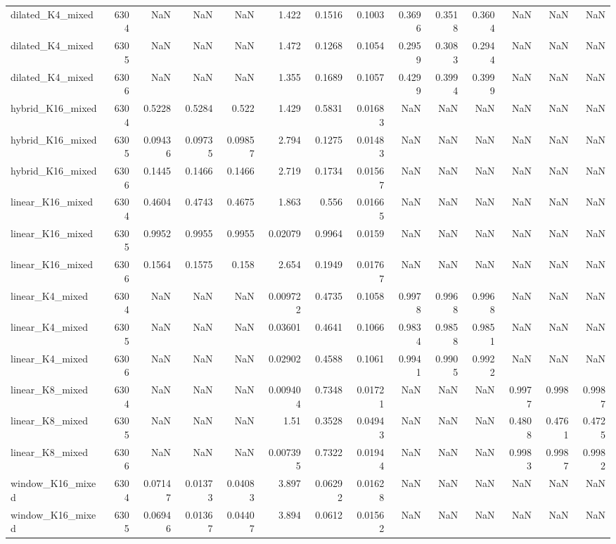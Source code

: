 \begin{table}
\begin{tabular}{lrrrrrrrrrrrrr}
dilated\_K4\_mixed & 6304 & NaN & NaN & NaN & 1.422 & 0.1516 & 0.1003 & 0.3696 & 0.3518 & 0.3604 & NaN & NaN & NaN \\
dilated\_K4\_mixed & 6305 & NaN & NaN & NaN & 1.472 & 0.1268 & 0.1054 & 0.2959 & 0.3083 & 0.2944 & NaN & NaN & NaN \\
dilated\_K4\_mixed & 6306 & NaN & NaN & NaN & 1.355 & 0.1689 & 0.1057 & 0.4299 & 0.3994 & 0.3999 & NaN & NaN & NaN \\
hybrid\_K16\_mixed & 6304 & 0.5228 & 0.5284 & 0.522 & 1.429 & 0.5831 & 0.01683 & NaN & NaN & NaN & NaN & NaN & NaN \\
hybrid\_K16\_mixed & 6305 & 0.09436 & 0.09735 & 0.09857 & 2.794 & 0.1275 & 0.01483 & NaN & NaN & NaN & NaN & NaN & NaN \\
hybrid\_K16\_mixed & 6306 & 0.1445 & 0.1466 & 0.1466 & 2.719 & 0.1734 & 0.01567 & NaN & NaN & NaN & NaN & NaN & NaN \\
linear\_K16\_mixed & 6304 & 0.4604 & 0.4743 & 0.4675 & 1.863 & 0.556 & 0.01665 & NaN & NaN & NaN & NaN & NaN & NaN \\
linear\_K16\_mixed & 6305 & 0.9952 & 0.9955 & 0.9955 & 0.02079 & 0.9964 & 0.0159 & NaN & NaN & NaN & NaN & NaN & NaN \\
linear\_K16\_mixed & 6306 & 0.1564 & 0.1575 & 0.158 & 2.654 & 0.1949 & 0.01767 & NaN & NaN & NaN & NaN & NaN & NaN \\
linear\_K4\_mixed & 6304 & NaN & NaN & NaN & 0.009722 & 0.4735 & 0.1058 & 0.9978 & 0.9968 & 0.9968 & NaN & NaN & NaN \\
linear\_K4\_mixed & 6305 & NaN & NaN & NaN & 0.03601 & 0.4641 & 0.1066 & 0.9834 & 0.9858 & 0.9851 & NaN & NaN & NaN \\
linear\_K4\_mixed & 6306 & NaN & NaN & NaN & 0.02902 & 0.4588 & 0.1061 & 0.9941 & 0.9905 & 0.9922 & NaN & NaN & NaN \\
linear\_K8\_mixed & 6304 & NaN & NaN & NaN & 0.009404 & 0.7348 & 0.01721 & NaN & NaN & NaN & 0.9977 & 0.998 & 0.9987 \\
linear\_K8\_mixed & 6305 & NaN & NaN & NaN & 1.51 & 0.3528 & 0.04943 & NaN & NaN & NaN & 0.4808 & 0.4761 & 0.4725 \\
linear\_K8\_mixed & 6306 & NaN & NaN & NaN & 0.007395 & 0.7322 & 0.01944 & NaN & NaN & NaN & 0.9983 & 0.9987 & 0.9982 \\
window\_K16\_mixed & 6304 & 0.07147 & 0.01373 & 0.04083 & 3.897 & 0.06292 & 0.01628 & NaN & NaN & NaN & NaN & NaN & NaN \\
window\_K16\_mixed & 6305 & 0.06946 & 0.01367 & 0.04407 & 3.894 & 0.0612 & 0.01562 & NaN & NaN & NaN & NaN & NaN & NaN \\

\end{tabular}
\end{table}
